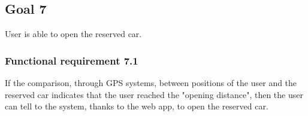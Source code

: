 \subsection{Goal 7}
User is able to open the reserved car.

\setcounter{secnumdepth}{3}
\subsubsection{Functional requirement 7.1}
If the comparison, through GPS systems, between positions of the user and the reserved car indicates that the user reached the "opening distance", then the user can tell to the system, thanks to the web app, to open the reserved car.